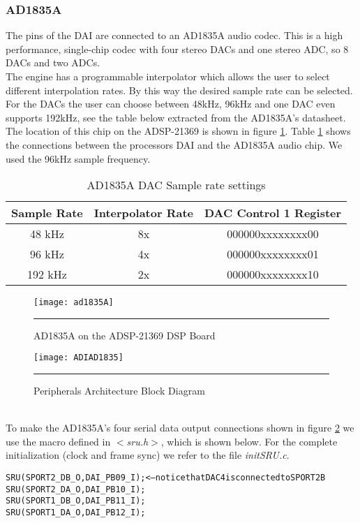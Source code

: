 \subsubsection{AD1835A}
The pins of the DAI are connected to an AD1835A audio codec. This is a high performance, single-chip codec with four stereo DACs and one stereo ADC, so 8 DACs and two ADCs. \\ The engine has a programmable interpolator which allows the user to select different interpolation rates. By this way the desired sample rate can be selected. For the DACs the user can choose between 48kHz, 96kHz and one DAC even supports 192kHz, see the table below extracted from the AD1835A's datasheet. The location of this chip on the ADSP-21369 is shown in figure \ref{fig:dac1}. Table \ref{tab:dac1} shows the connections between the processors DAI and the AD1835A audio chip. We used the 96kHz sample frequency.\\
\begin{table}[!hb]
\begin{center}
\begin{tabular}[!hb]{|c|c|c|}
\hline
\textbf{Sample Rate} & \textbf{Interpolator Rate} & \textbf{DAC Control 1 Register}\\
\hline
48 kHz & 8x & 000000xxxxxxxx00\\
\hline
96 kHz & 4x & 000000xxxxxxxx01 \\
\hline
192 kHz & 2x & 000000xxxxxxxx10 \\
\hline
\end{tabular}
\caption{AD1835A DAC Sample rate settings}
\label{tab:dac1}
\end{center}
\end{table}
\begin{figure}[htbp]
\centering
\texttt{[image: ad1835A]}
\rule{30em}{0.5pt}
\caption{AD1835A on the ADSP-21369 DSP Board}
\label{fig:dac1}
\end{figure}
\begin{figure}[htbp]
\centering
\texttt{[image: ADIAD1835]}
\rule{30em}{0.5pt}
\caption{Peripherals Architecture Block Diagram}
\label{fig:ADIAD1835}
\end{figure}\\
To make the AD1835A's four serial data output connections shown in figure \ref{fig:ADIAD1835} we use the macro defined in \emph{$<$sru.h$>$}, which is shown below. For the complete initialization (clock and frame sync) we refer to the file \emph{initSRU.c}.
\begin{alltt}
    SRU(SPORT2_DB_O,DAI_PB09_I);  <-- notice that DAC4 is connected to SPORT2B
    SRU(SPORT2_DA_O,DAI_PB10_I);
    SRU(SPORT1_DB_O,DAI_PB11_I);
    SRU(SPORT1_DA_O,DAI_PB12_I);
\end{alltt}

